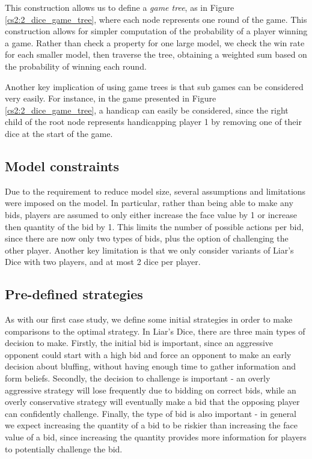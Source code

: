 This construction allows us to define a \emph{game tree}, as in Figure \ref{cs2:2_dice_game_tree}, where each node represents one round of the game. This construction allows for simpler computation of the probability of a player winning a game. Rather than check a property for one large model, we check the win rate for each smaller model, then traverse the tree, obtaining a weighted sum based on the probability of winning each round.

Another key implication of using game trees is that sub games can be considered very easily. For instance, in the game presented in Figure \ref{cs2:2_dice_game_tree}, a handicap can easily be considered, since the right child of the root node represents handicapping player 1 by removing one of their dice at the start of the game.

\subsection{Model constraints}

Due to the requirement to reduce model size, several assumptions and limitations were imposed on the model. In particular, rather than being able to make any bids, players are assumed to only either increase the face value by 1 or increase then quantity of the bid by 1. This limits the number of possible actions per bid, since there are now only two types of bids, plus the option of challenging the other player. Another key limitation is that we only consider variants of Liar's Dice with two players, and at most 2 dice per player.

\subsection{Pre-defined strategies}
\label{cs2:pre_def_strats}

As with our first case study, we define some initial strategies in order to make comparisons to the optimal strategy. In Liar's Dice, there are three main types of decision to make. Firstly, the initial bid is important, since an aggressive opponent could start with a high bid and force an opponent to make an early decision about bluffing, without having enough time to gather information and form beliefs. Secondly, the decision to challenge is important - an overly aggressive strategy will lose frequently due to bidding on correct bids, while an overly conservative strategy will eventually make a bid that the opposing player can confidently challenge. Finally, the type of bid is also important - in general we expect increasing the quantity of a bid to be riskier than increasing the face value of a bid, since increasing the quantity provides more information for players to potentially challenge the bid.

